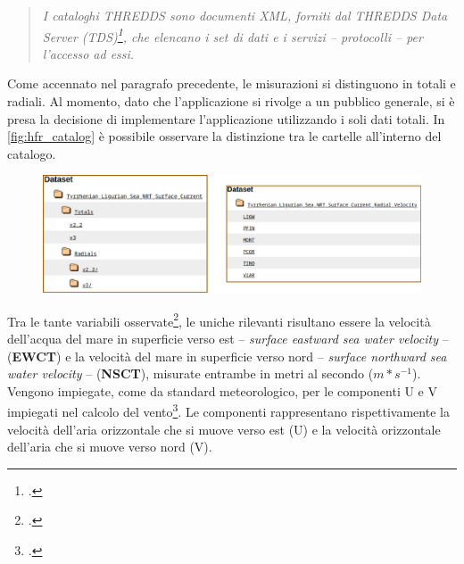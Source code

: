 \documentclass[./main.tex]{subfiles}
\begin{document}
\begin{quote}
\textit{I cataloghi THREDDS sono documenti XML, forniti dal THREDDS Data Server (TDS)\footcite[\url{https://doi.org/10.5065/D6N014KG}]{website-unidata-ucar-edu}, che elencano i set di dati e i servizi -- \textit{protocolli} -- per l'accesso ad essi.}
\end{quote}

Come accennato nel paragrafo precedente, le misurazioni si distinguono in totali e radiali. Al momento, dato che l'applicazione si rivolge a un pubblico generale, si è presa la decisione di implementare l'applicazione utilizzando i soli dati totali. In \autoref{fig:hfr_catalog} è possibile osservare la distinzione tra le cartelle all'interno del catalogo.

\begin{figure}[!ht]
\noindent\begin{minipage}{\textwidth}
\vspace{1cm}
\includegraphics[width=\textwidth]{images/hfr_catalog.pdf}
\captionsetup{font=small, hypcap=false}
\label{fig:hfr_catalog}
\end{minipage}
\vspace{0.25cm}
\end{figure}

Tra le tante variabili osservate\footcite[40-50]{HFR_QC_JERICO}, le uniche rilevanti risultano essere la velocità dell'acqua del mare in superficie verso est --  \textit{surface eastward sea water velocity} -- (\textbf{EWCT}) e la velocità del mare in superficie verso nord -- \textit{surface northward sea water velocity} -- (\textbf{NSCT}), misurate entrambe in metri al secondo ($m*s^{-1}$). Vengono impiegate, come da standard meteorologico, per le componenti U e V impiegati nel calcolo del vento\footcite[\url{https://confluence.ecmwf.int/pages/viewpage.action?pageId=111155337}]{website-ecmwf-confluence}. Le componenti rappresentano rispettivamente la velocità dell'aria orizzontale che si muove verso est (U) e la velocità orizzontale dell'aria che si muove verso nord (V).
\end{document}
